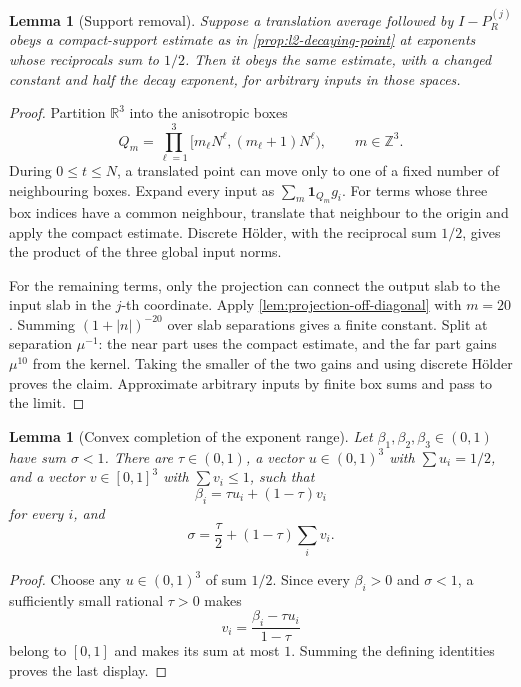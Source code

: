 \documentclass[11pt]{article}
\newtheorem{lemma}[theorem]{Lemma}
\newcommand{\R}{\mathbb{R}}
\newcommand{\one}{\mathbf{1}}
\newcommand{\abs}[1]{\left|#1\right|}
\begin{document}
	\begin{lemma}[Support removal]\label{lem:support-removal}
		Suppose a translation average followed by \(I-P_R^{(j)}\) obeys a compact-support estimate as in \cref{prop:l2-decaying-point} at exponents whose reciprocals sum to \(1/2\).  Then it obeys the same estimate, with a changed constant and half the decay exponent, for arbitrary inputs in those spaces.
	\end{lemma}
	
	\begin{proof}
		Partition \(\R^3\) into the anisotropic boxes
		\[
		Q_m=\prod_{\ell=1}^3
		[m_\ell N^\ell,(m_\ell+1)N^\ell),
		\qquad m\in\mathbb Z^3.
		\]
		During \(0\leq t\leq N\), a translated point can move only to one of a fixed number of neighbouring boxes.  Expand every input as
		\(\sum_m\one_{Q_m}g_i\).  For terms whose three box indices have a common neighbour, translate that neighbour to the origin and apply the compact estimate.  Discrete H\"older, with the reciprocal sum \(1/2\), gives the product of the three global input norms.
		
		For the remaining terms, only the projection can connect the output slab to the input slab in the \(j\)-th coordinate.  Apply
		\cref{lem:projection-off-diagonal} with \(m=20\).  Summing
		\((1+\abs n)^{-20}\) over slab separations gives a finite constant.  Split at separation \(\mu^{-1}\): the near part uses the compact estimate, and the far part gains \(\mu^{10}\) from the kernel.  Taking the smaller of the two gains and using discrete H\"older proves the claim.  Approximate arbitrary inputs by finite box sums and pass to the limit.
	\end{proof}
	
	\begin{lemma}[Convex completion of the exponent range]\label{lem:convex-exponent-completion}
		Let \(\beta_1,\beta_2,\beta_3\in(0,1)\) have sum \(\sigma<1\).  There are
		\(\tau\in(0,1)\), a vector \(u\in(0,1)^3\) with \(\sum u_i=1/2\), and a vector
		\(v\in[0,1]^3\) with \(\sum v_i\leq1\), such that
		\[
		\beta_i=\tau u_i+(1-\tau)v_i
		\]
		for every \(i\), and
		\[
		\sigma=\frac{\tau}{2}+(1-\tau)\sum_i v_i.
		\]
	\end{lemma}
	
	\begin{proof}
		Choose any \(u\in(0,1)^3\) of sum \(1/2\).  Since every \(\beta_i>0\) and \(\sigma<1\), a sufficiently small rational
		\(\tau>0\) makes
		\[
		v_i=\frac{\beta_i-\tau u_i}{1-\tau}
		\]
		belong to \([0,1]\) and makes its sum at most \(1\).  Summing the defining identities proves the last display.
	\end{proof}
	
\end{document}
